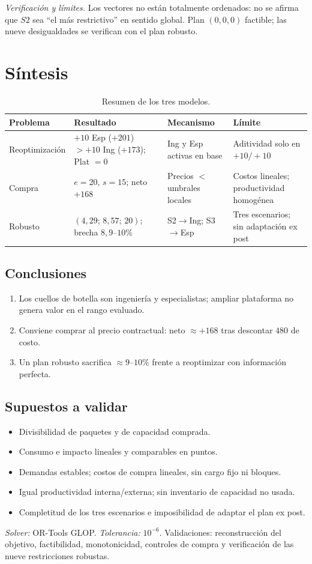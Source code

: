 \documentclass[11pt,a4paper]{article}
\newcommand{\verif}[1]{\noindent\small\textit{Verificación y límites.} #1\par}
\begin{document}
\verif{Los vectores no están totalmente ordenados: no se afirma que $S2$ sea ``el más restrictivo'' en sentido global. Plan $(0,0,0)$ factible; las nueve desigualdades se verifican con el plan robusto.}

\section{Síntesis}

\begin{table}[H]
\centering
\small
\caption{Resumen de los tres modelos.}
\label{tab:sint}
\begin{tabularx}{\textwidth}{@{}lXXX@{}}
\toprule
Problema & Resultado & Mecanismo & Límite \\
\midrule
Reoptimización & $+10$ Esp ($+201$) $> +10$ Ing ($+173$); Plat $=0$ & Ing y Esp activas en base & Aditividad solo en $+10/+10$ \\
Compra & $e=20$, $s=15$; neto $+168$ & Precios $<$ umbrales locales & Costos lineales; productividad homogénea \\
Robusto & $(4{,}29;\,8{,}57;\,20)$; brecha $8{,}9$--$10\%$ & S2$\to$Ing; S3$\to$Esp & Tres escenarios; sin adaptación ex post \\
\bottomrule
\end{tabularx}
\end{table}

\subsection*{Conclusiones}
\begin{enumerate}
\item Los cuellos de botella son ingeniería y especialistas; ampliar plataforma no genera valor en el rango evaluado.
\item Conviene comprar al precio contractual: neto $\approx +168$ tras descontar $480$ de costo.
\item Un plan robusto sacrifica $\approx 9$--$10\%$ frente a reoptimizar con información perfecta.
\end{enumerate}

\subsection*{Supuestos a validar}
\begin{itemize}
\item Divisibilidad de paquetes y de capacidad comprada.
\item Consumo e impacto lineales y comparables en puntos.
\item Demandas estables; costos de compra lineales, sin cargo fijo ni bloques.
\item Igual productividad interna/externa; sin inventario de capacidad no usada.
\item Completitud de los tres escenarios e imposibilidad de adaptar el plan ex post.
\end{itemize}

\vspace{0.5em}
\noindent\small\textit{Solver:} OR-Tools GLOP. \textit{Tolerancia:} $10^{-6}$. Validaciones: reconstrucción del objetivo, factibilidad, monotonicidad, controles de compra y verificación de las nueve restricciones robustas.
\end{document}
